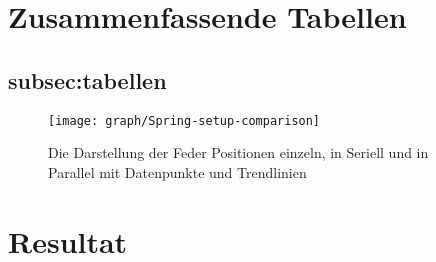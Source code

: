 \documentclass[../main.tex]{subfiles} %
\begin{document}
\section{Zusammenfassende Tabellen}\label{sec:zusammenfassende-tabellen}
    \subsection{subsec:tabellen}\label{subsec:tabellen}
    \begin{figure}[H]
        \centering
        \texttt{[image: graph/Spring-setup-comparison]}
        \caption{Die Darstellung der Feder Positionen einzeln, in Seriell und in Parallel mit Datenpunkte und Trendlinien}
    \end{figure}
    \section{Resultat}\label{subsec:resultat}
\end{document}
